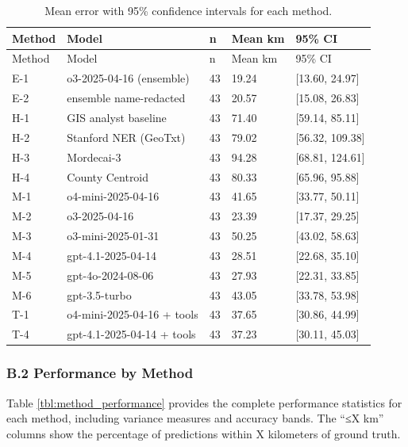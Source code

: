 \documentclass[
  10pt,
  twocolumn]{article}
\begin{document}
\begin{longtable}[]{@{}lllll@{}}
\caption{\label{tbl:error_ci}Mean error with 95\% confidence intervals
for each method.}\tabularnewline
\toprule\noalign{}
Method & Model & n & Mean km & 95\% CI \\
\midrule\noalign{}
\endfirsthead
\toprule\noalign{}
Method & Model & n & Mean km & 95\% CI \\
\midrule\noalign{}
\endhead
\bottomrule\noalign{}
\endlastfoot
E-1 & o3-2025-04-16 (ensemble) & 43 & 19.24 & {[}13.60, 24.97{]} \\
E-2 & ensemble name-redacted & 43 & 20.57 & {[}15.08, 26.83{]} \\
H-1 & GIS analyst baseline & 43 & 71.40 & {[}59.14, 85.11{]} \\
H-2 & Stanford NER (GeoTxt) & 43 & 79.02 & {[}56.32, 109.38{]} \\
H-3 & Mordecai-3 & 43 & 94.28 & {[}68.81, 124.61{]} \\
H-4 & County Centroid & 43 & 80.33 & {[}65.96, 95.88{]} \\
M-1 & o4-mini-2025-04-16 & 43 & 41.65 & {[}33.77, 50.11{]} \\
M-2 & o3-2025-04-16 & 43 & 23.39 & {[}17.37, 29.25{]} \\
M-3 & o3-mini-2025-01-31 & 43 & 50.25 & {[}43.02, 58.63{]} \\
M-4 & gpt-4.1-2025-04-14 & 43 & 28.51 & {[}22.68, 35.10{]} \\
M-5 & gpt-4o-2024-08-06 & 43 & 27.93 & {[}22.31, 33.85{]} \\
M-6 & gpt-3.5-turbo & 43 & 43.05 & {[}33.78, 53.98{]} \\
T-1 & o4-mini-2025-04-16 + tools & 43 & 37.65 & {[}30.86, 44.99{]} \\
T-4 & gpt-4.1-2025-04-14 + tools & 43 & 37.23 & {[}30.11, 45.03{]} \\
\end{longtable}

\subsubsection{B.2 Performance by
Method}\label{b.2-performance-by-method}

Table \ref{tbl:method_performance} provides the complete performance
statistics for each method, including variance measures and accuracy
bands. The ``≤X km'' columns show the percentage of predictions within X
kilometers of ground truth.
\end{document}
